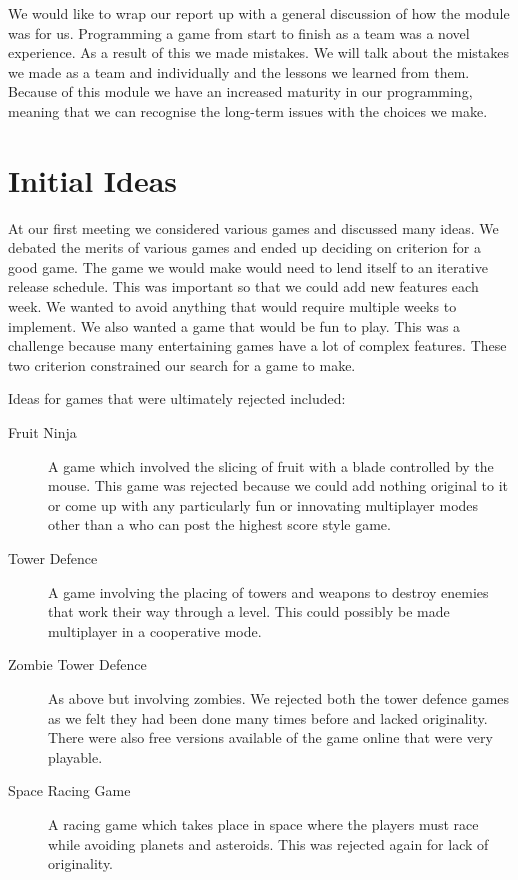 We would like to wrap our report up with a general discussion of how
the module was for us. Programming a game from start to finish as a
team was a novel experience. As a result of this we made mistakes. We
will talk about the mistakes we made as a team and individually and
the lessons we learned from them. Because of this module we have an
increased maturity in our programming, meaning that we can recognise
the long-term issues with the choices we make.


\section{Initial Ideas}


At our first meeting we considered various games and discussed many
ideas. We debated the merits of various games and ended up deciding on
criterion for a good game. The game we would make would need to lend
itself to an iterative release schedule. This was important so that we
could add new features each week. We wanted to avoid anything that
would require multiple weeks to implement. We also wanted a game that
would be fun to play. This was a challenge because many entertaining
games have a lot of complex features. These two criterion constrained
our search for a game to make.


Ideas for games that were ultimately rejected included:

\begin{description}
\item [Fruit Ninja] A game which involved the slicing of fruit with a
  blade controlled by the mouse. This game was rejected because we
  could add nothing original to it or come up with any particularly
  fun or innovating multiplayer modes other than a who can post the
  highest score style game.

\item [Tower Defence] A game involving the placing of towers and
  weapons to destroy enemies that work their way through a level. This
  could possibly be made multiplayer in a cooperative mode.

\item [Zombie Tower Defence] As above but involving zombies. We
  rejected both the tower defence games as we felt they had been done
  many times before and lacked originality. There were also free
  versions available of the game online that were very playable.

\item [Space Racing Game] A racing game which takes place in space
  where the players must race while avoiding planets and
  asteroids. This was rejected again for lack of originality.
\end{description}


